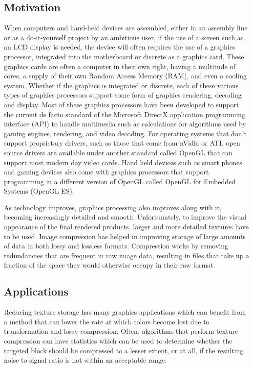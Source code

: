 \documentclass[12pt]{CPP}
\begin{document}
\subsection{Motivation}
When computers and hand-held devices are assembled, either in an assembly line or as a do-it-yourself project by an ambitious user, if the use of a screen such as an LCD display is needed, the device will often requires the use of a graphics processor, integrated into the motherboard or discrete as a graphics card. These graphics cards are often a computer in their own right, having a multitude of cores, a supply of their own Random Access Memory (RAM), and even a cooling system. Whether if the graphics is integrated or discrete, each of these various types of graphics processors support some form of graphics rendering, decoding and display. Most of these graphics processors have been developed to support the current de facto standard of the Microsoft DirectX application programming interface (API) to handle multimedia such as calculations for algorithms used by gaming engines, rendering, and video decoding. For operating systems that don't support proprietary drivers, such as those that come from nVidia or ATI, open source drivers are available under another standard called OpenGL that can support most modern day video cards. Hand held devices such as smart phones and gaming devices also come with graphics processors that support programming in a different version of OpenGL called OpenGL for Embedded Systems (OpenGL ES).

As technology improves, graphics processing also improves along with it, becoming increasingly detailed and smooth. Unfortunately, to improve the visual appearance of the final rendered products, larger and more detailed textures have to be used. Image compression has helped in improving storage of large amounts of data in both lossy and lossless formats. Compression works by removing redundancies that are frequent in raw image data, resulting in files that take up a fraction of the space they would otherwise occupy in their raw format.

\subsection{Applications}
Reducing texture storage has many graphics applications which can benefit from a method that can lower the rate at which colors become lost due to transformation and lossy compression. Often, algorithms that perform texture compression can have statistics which can be used to determine whether the targeted block should be compressed to a lesser extent, or at all, if the resulting noise to signal ratio is not within an acceptable range.
\end{document}
